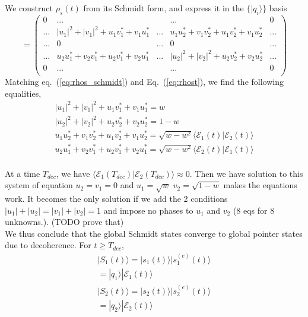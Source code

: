\documentclass{article}
\begin{document}
We construct $\rho_s(t)$ from its Schmidt form, and express it in the $\{|q_i\rangle\}$ basis
\begin{equation}
    =\begin{pmatrix}
        0 & ... & & ... & 0 \\
        ... & |u_1|^2+|v_1|^2+u_1v_1^*+v_1u_1^* & ... & u_1u_2^*+v_1v_2^*+u_1v_2^*+v_1u_2^* & ... \\
        ... & 0 & ... & 0 & ... \\
        ... & u_2u_1^*+v_2v_1^*+u_2v_1^*+v_2u_1^* & ... & |u_2|^2+|v_2|^2+u_2v_2^*+v_2u_2^* & ... \\
        0 & ... & & ... & 0 \\
    \end{pmatrix}
    \label{eq:rhos_schmidt}
\end{equation}
Matching eq.~(\ref{eq:rhos_schmidt}) and Eq.~(\ref{eq:rhost}), we find the following equalities,
\begin{align*}
    |u_1|^2+|v_1|^2+u_1v_1^*+v_1u_1^* = w\\
    |u_2|^2+|v_2|^2+u_2v_2^*+v_2u_2^* = 1-w\\
    u_1u_2^*+v_1v_2^*+u_1v_2^*+v_1u_2^* = \sqrt{w-w^2}\langle\mathcal{E}_1(t)|\mathcal{E}_2(t)\rangle\\
    u_2u_1^*+v_2v_1^*+u_2v_1^*+v_2u_1^* = \sqrt{w-w^2}\langle \mathcal{E}_2(t)|\mathcal{E}_1(t)\rangle\\
\end{align*}

At a time $T_{dec}$, we have $\langle \mathcal{E}_1(T_{dec})|\mathcal{E}_2(T_{dec})\rangle\approx0$. Then we have solution to this system of equation $u_2=v_1=0$ and $u_1=\sqrt{w}$ $v_2=\sqrt{1-w}$ makes the equations work. It becomes the only solution if we add the 2 conditions $|u_1|+|u_2|=|v_1|+|v_2|=1$ and impose no phases to $u_1$ and $v_2$  (8 eqs for 8 unknowns.). (TODO prove that)\\

We thus conclude that the global Schmidt states converge to global pointer states due to decoherence. For $t\geq T_{dec}$,
\begin{align*}
    |S_1(t)\rangle = |s_1(t)\rangle|s^{(e)}_1(t)\rangle\\
    =|q_1\rangle|\mathcal{E}_1(t)\rangle
    \\
    |S_2(t)\rangle = |s_2(t)\rangle|s^{(e)}_2(t)\rangle\\
    =|q_2\rangle|\mathcal{E}_2(t)\rangle
\end{align*}
\end{document}
